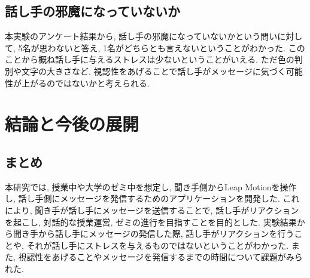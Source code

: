 \documentclass{funthesis}
\begin{document}

\section{話し手の邪魔になっていないか}
本実験のアンケート結果から, 話し手の邪魔になっていないかという問いに対して, 5名が思わないと答え, 1名がどちらとも言えないということがわかった. このことから概ね話し手に与えるストレスは少ないということがいえる. ただ色の判別や文字の大きさなど, 視認性をあげることで話し手がメッセージに気づく可能性が上がるのではないかと考えられる. 




\chapter{結論と今後の展開}

\section{まとめ}
本研究では, 授業中や大学のゼミ中を想定し, 聞き手側からLeap Motionを操作し, 話し手側にメッセージを発信するためのアプリケーションを開発した. これにより, 聞き手が話し手にメッセージを送信することで, 話し手がリアクションを起こし, 対話的な授業運営, ゼミの進行を目指すことを目的とした. 実験結果から聞き手から話し手にメッセージの発信した際, 話し手がリアクションを行うことや, それが話し手にストレスを与えるものではないということがわかった. また, 視認性をあげることやメッセージを発信するまでの時間について課題がみられた. 



\end{document}
